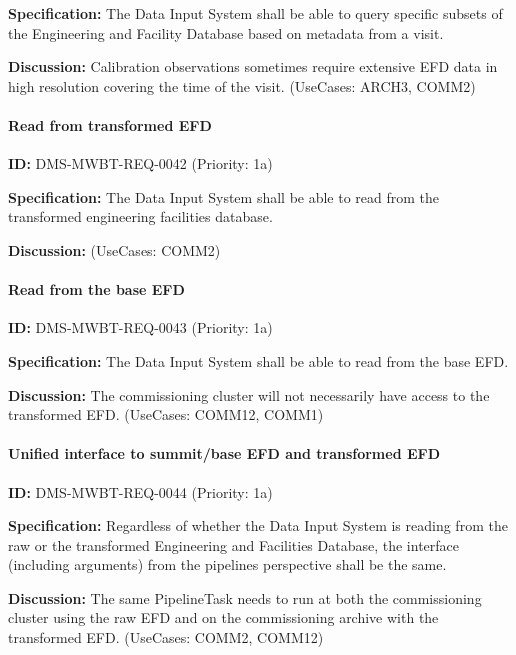 \documentclass[SE,toc,lsstdraft]{lsstdoc}
\begin{document}
\textbf{Specification:}
The Data Input System shall be able to query specific subsets of the Engineering and Facility Database based on metadata from a visit.

\textbf{Discussion:}
Calibration observations sometimes require extensive EFD data in high resolution covering the time of the visit. (UseCases: ARCH3, COMM2)

\paragraph{Read from transformed EFD}\hfill  %

\label{DMS-MWBT-REQ-0042}
\textbf{ID:} DMS-MWBT-REQ-0042 (Priority: 1a)

\textbf{Specification:}
The Data Input System shall be able to read from the transformed engineering facilities database.

\textbf{Discussion:}
(UseCases: COMM2)

\paragraph{Read from the base EFD}\hfill  %

\label{DMS-MWBT-REQ-0043}
\textbf{ID:} DMS-MWBT-REQ-0043 (Priority: 1a)

\textbf{Specification:}
The Data Input System shall be able to read from the base EFD.

\textbf{Discussion:}
The commissioning cluster will not necessarily have access to the transformed EFD. (UseCases: COMM12, COMM1)

\paragraph{Unified interface to summit/base EFD and transformed EFD}\hfill  %

\label{DMS-MWBT-REQ-0044}
\textbf{ID:} DMS-MWBT-REQ-0044 (Priority: 1a)

\textbf{Specification:}
Regardless of whether the Data Input System is reading from the raw or the transformed Engineering and Facilities Database, the interface (including arguments) from the pipelines perspective shall be the same.

\textbf{Discussion:}
The same PipelineTask needs to run at both the commissioning cluster using the raw EFD and on the commissioning archive with the transformed EFD. (UseCases: COMM2, COMM12)
\end{document}
